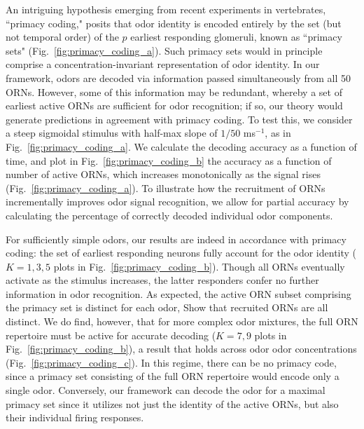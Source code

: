 An intriguing hypothesis emerging from recent experiments in vertebrates, ``primacy coding,"  posits that odor identity is encoded entirely by the set (but not temporal order) of the $p$ earliest responding glomeruli, known as ``primacy sets" (Fig.~\ref{fig:primacy_coding_a}). %
Such primacy sets would in principle comprise a concentration-invariant representation of odor identity. In our framework, odors are decoded via information passed simultaneously from all 50 ORNs. However, some of this information may be redundant, whereby a set of earliest active ORNs are sufficient for odor recognition; if so, our theory would generate predictions in agreement with primacy coding. To test this, we consider a steep sigmoidal stimulus with half-max slope of $1/50$ ms$^{-1}$, as in Fig.~\ref{fig:primacy_coding_a}. We calculate the decoding accuracy as a function of time, and plot in Fig.~\ref{fig:primacy_coding_b} the accuracy as a function of number of active ORNs, which increases monotonically as the signal rises (Fig.~\ref{fig:primacy_coding_a}). To illustrate how the recruitment of ORNs incrementally improves odor signal recognition, we allow for partial accuracy by calculating  the percentage of correctly decoded individual odor components.

For sufficiently simple odors, our results are indeed in accordance with primacy coding: the set of earliest responding neurons fully account for the odor identity ($K=1, 3, 5$ plots in Fig.~\ref{fig:primacy_coding_b}). Though all ORNs eventually activate as the stimulus increases, the latter responders confer no further information in odor recognition. As expected, the active ORN subset comprising the primacy set is distinct for each odor,   {\color{blue} Show that recruited ORNs are all distinct}. We do find, however, that for more complex odor mixtures, the full ORN repertoire must be active for  accurate decoding ($K=7, 9$ plots in Fig.~\ref{fig:primacy_coding_b}), a result that holds across odor  odor concentrations (Fig.~\ref{fig:primacy_coding_c}). In this regime, there can  be no primacy code, since a primacy set consisting of the full ORN repertoire would encode only a single odor. Conversely, our framework can decode the odor for a maximal primacy set since it utilizes not just the identity of the active ORNs, but also their individual firing responses. 

